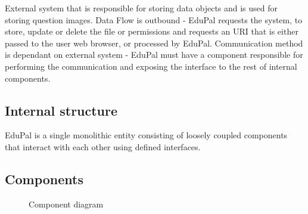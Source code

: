 External system that is responsible for storing data objects and is used for storing question images. Data Flow is outbound - EduPal requests the system, to store, update or delete the file or permissions and requests an URI that is either passed to the user web browser, or processed by EduPal. Communication method is dependant on external system - EduPal must have a component responsible for performing the communication and exposing the interface to the rest of internal components.

\subsection{Internal structure}

EduPal is a single monolithic entity consisting of loosely coupled components that interact with each other using defined interfaces.

\subsection{Components}

\begin{figure}[H]
  \label{fig:viewpoint-functional-components-v2}
  \caption{Component diagram}
\end{figure}

